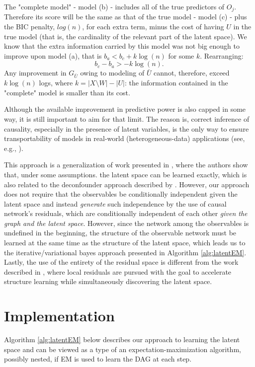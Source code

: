 \documentclass[letterpaper]{article}
\begin{document}
The "complete model" - model (b) - includes all of the true predictors of $O_j$.  Therefore its score will be the same as that of the true model - model (c) - plus the BIC penalty, $log(n)$, for each extra term, minus the cost of having $U$ in the true model (that is, the cardinality of the relevant part of the latent space).  We know that the extra information carried by this model was not big enough to improve upon model (a), that is $b_a < b_c + k \log(n)$ for some $k$.  Rearranging:
\begin{equation}
    b_c - b_a > -k\log(n).
    \label{eq:ceilingTheorem}
\end{equation}
Any improvement in $G_{\bar{U}}$ owing to modeling of $\bar{U}$ cannot, therefore, exceed $k\log(n)$ logs, where $k = |X \setminus W| - |U|$: the information contained in the "complete" model is smaller than its cost.

Although the available improvement in predictive power is also capped in some way, it is still important to aim for that limit.  The reason is, correct inference of causality, especially in the presence of latent variables, is the only way to ensure transportability of models in real-world (heterogeneous-data) applications (see, e.g., \cite{bareinboim_causal_2016}).

This approach is a generalization of work presented in \cite{anandkumar_learning_2013}, where the authors show that, under some assumptions. the latent space can be learned exactly, which is also related to the deconfounder approach described by \cite{wang_deconfounder_2019}.  However, our approach does not require that the observables be conditionally independent given the latent space and instead \textit{generate} such independence by the use of causal network's residuals, which are conditionally independent of each other \textit{given the graph and the latent space}.  However, since the network among the observables is undefined in the beginning, the structure of the observable network must be learned at the same time as the structure of the latent space, which leads us to the iterative/variational bayes approach presented in Algorithm \ref{alg:latentEM}.  Lastly, the use of the entirety of the residual space is different from the work described in \cite{elidan_ideal_2007}, where local residuals are pursued with the goal to accelerate structure learning while simultaneously discovering the latent space.

\section{Implementation}
Algorithm \ref{alg:latentEM} below describes our approach to learning the latent space and can be viewed as a type of an expectation-maximization algorithm, possibly nested, if EM is used to learn the DAG at each step.
\end{document}
